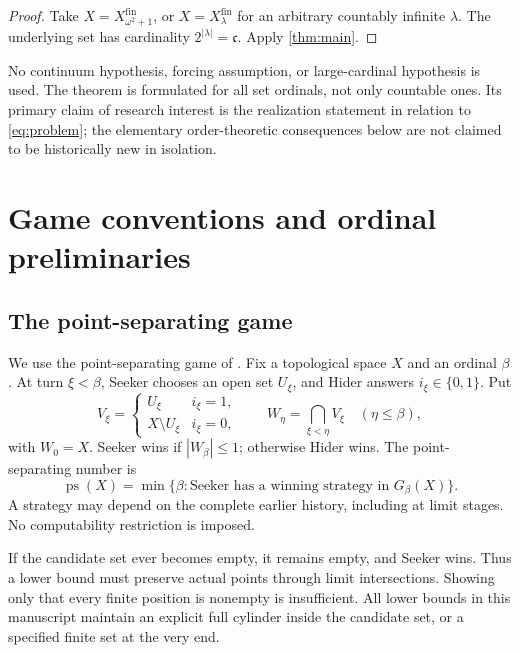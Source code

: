 \documentclass[11pt,a4paper]{article}
\newtheorem{corollary}[theorem]{Corollary}
\theoremstyle{definition}
\theoremstyle{remark}
\newcommand{\ps}{\operatorname{ps}}
\newcommand{\fin}{\mathrm{fin}}
\newcommand{\two}{\{0,1\}}
\newcommand{\cfr}{\mathfrak c}
\begin{document}
\begin{proof}
Take $X=X_{\omega^2+1}^\fin$, or $X=X_\lambda^\fin$ for an arbitrary countably
infinite $\lambda$. The underlying set has cardinality $2^{|\lambda|}=\cfr$.
Apply \cref{thm:main}.
\end{proof}

No continuum hypothesis, forcing assumption, or large-cardinal hypothesis is
used. The theorem is formulated for all set ordinals, not only countable ones.
Its primary claim of research interest is the realization statement in relation
to \eqref{eq:problem}; the elementary order-theoretic consequences below are not
claimed to be historically new in isolation.

\section{Game conventions and ordinal preliminaries}

\subsection{The point-separating game}
We use the point-separating game of \cite[Definition~1.1]{CCS}.
Fix a topological space $X$ and an ordinal $\beta$. At turn $\xi<\beta$, Seeker
chooses an open set $U_\xi$, and Hider answers $i_\xi\in\two$. Put
\[
 V_\xi=\begin{cases}U_\xi&i_\xi=1,\\X\setminus U_\xi&i_\xi=0,
 \end{cases}
 \qquad
 W_\eta=\bigcap_{\xi<\eta}V_\xi\quad(\eta\leq\beta),
\]
with $W_0=X$. Seeker wins if $|W_\beta|\leq1$; otherwise Hider wins. The
point-separating number is
\[
 \ps(X)=\min\{\beta:\text{Seeker has a winning strategy in }G_\beta(X)\}.
\]
A strategy may depend on the complete earlier history, including at limit
stages. No computability restriction is imposed.

If the candidate set ever becomes empty, it remains empty, and Seeker wins.
Thus a lower bound must preserve actual points through limit intersections.
Showing only that every finite position is nonempty is insufficient. All lower
bounds in this manuscript maintain an explicit full cylinder inside the candidate
set, or a specified finite set at the very end.
\end{document}
